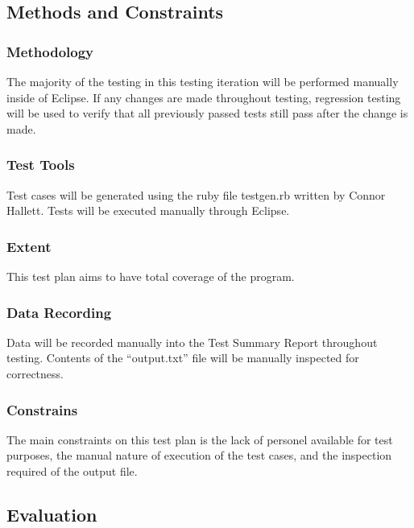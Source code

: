 \documentclass[]{article}
\begin{document}

\subsection{Methods and Constraints}
	\subsubsection{Methodology}
	\label{sub:user_characteristics}
	The majority of the testing in this testing iteration will be performed
	manually inside of Eclipse.  If any changes are made throughout testing,
	regression testing will be used to verify that all previously passed tests
	still pass after the change is made.
	
	\subsubsection{Test Tools}
	Test cases will be generated using the ruby file testgen.rb written by Connor
	Hallett.
	Tests will be executed manually through Eclipse.
	
	\subsubsection{Extent}
	This test plan aims to have total coverage of the program.
	
	\subsubsection{Data Recording}
	Data will be recorded manually into the Test Summary Report throughout testing.
	Contents of the ``output.txt'' file will be manually inspected for correctness.
	
	\subsubsection{Constrains}
	The main constraints on this test plan is the lack of personel available for
	test purposes, the manual nature of execution of the test cases, and the
	inspection required of the output file.

\subsection{Evaluation}
\end{document}
